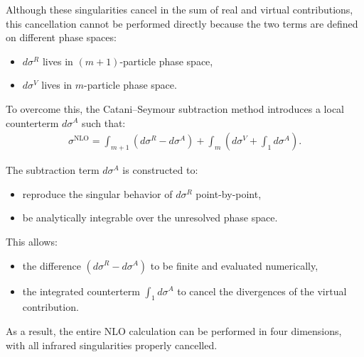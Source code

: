 \documentclass[11pt]{article}
\begin{document}
Although these singularities cancel in the sum of real and virtual contributions,
this cancellation cannot be performed directly because the two terms are defined
on different phase spaces:
\begin{itemize}
    \item $d\sigma^R$ lives in $(m+1)$-particle phase space,
    \item $d\sigma^V$ lives in $m$-particle phase space.
\end{itemize}

To overcome this, the Catani--Seymour subtraction method introduces
a local counterterm $d\sigma^A$ such that:
\begin{align}
\sigma^{\text{NLO}} =
\int_{m+1} \left(d\sigma^R - d\sigma^A \right)
+
\int_m \left(d\sigma^V + \int_1 d\sigma^A \right).
\end{align}

The subtraction term $d\sigma^A$ is constructed to:
\begin{itemize}
    \item reproduce the singular behavior of $d\sigma^R$ point-by-point,
    \item be analytically integrable over the unresolved phase space.
\end{itemize}

This allows:
\begin{itemize}
    \item the difference $(d\sigma^R - d\sigma^A)$ to be finite and evaluated numerically,
    \item the integrated counterterm $\int_1 d\sigma^A$ to cancel the divergences
    of the virtual contribution.
\end{itemize}

As a result, the entire NLO calculation can be performed in four dimensions,
with all infrared singularities properly cancelled.









\end{document}
